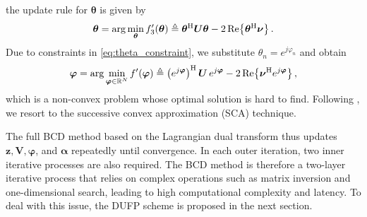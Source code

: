 the update rule for $\bm{\theta}$ is given by
\begin{equation}
    \bm{\theta} = \arg\min_{\bm{\theta}} f_3'(\bm{\theta}) \triangleq \bm{\theta}^{{\mathrm{H}}}\bm{U}\bm{\theta} - 2\,\mathrm{Re}\!\left\{\bm{\theta}^{{\mathrm{H}}}\bm{\nu}\right\}.
\end{equation}
Due to constraints in \eqref{eq:theta_constraint}, we substitute $\theta_n = e^{j\varphi_n}$ and obtain
\begin{equation}
    \bm{\varphi} = \arg\min_{\bm{\varphi} \in \mathbb{R}^N} f'(\bm{\varphi}) \triangleq \left(e^{j\bm{\varphi}}\right)^{{\mathrm{H}}}\bm{U}\,e^{j\bm{\varphi}} - 2\,\mathrm{Re}\!\left\{\bm{\nu}^{{\mathrm{H}}} e^{j\bm{\varphi}}\right\},
\end{equation}
which is a non-convex problem whose optimal solution is hard to find. Following \cite{shen2018fractional}, we resort to the successive convex approximation (SCA) technique.

The full BCD method based on the Lagrangian dual transform thus updates $\bm{z}, \bm{V}, \bm{\varphi}$, and $\bm{\alpha}$ repeatedly until convergence. In each outer iteration, two inner iterative processes are also required. The BCD method is therefore a two-layer iterative process that relies on complex operations such as matrix inversion and one-dimensional search, leading to high computational complexity and latency. To deal with this issue, the DUFP scheme is proposed in the next section.


